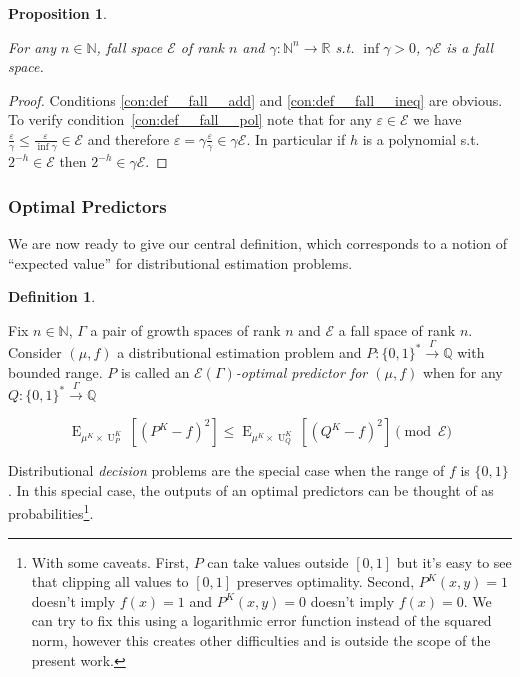 \documentclass{article}
\numberwithin{equation}{section}
\theoremstyle{definition}
\newtheorem{definition}{Definition}[section]
\theoremstyle{plain}
\newtheorem{proposition}{Proposition}[section]
\newcommand{\Bool}{\{0,1\}}
\newcommand{\Words}{{\Bool^*}}
\DeclareMathOperator{\E}{E}
\DeclareMathOperator{\Un}{U}
\newcommand{\Nats}{\mathbb{N}}
\newcommand{\Rats}{\mathbb{Q}}
\newcommand{\Reals}{\mathbb{R}}
\newcommand{\Fall}{\mathcal{E}}
\newcommand{\EG}{\Fall(\Gamma)}
\newcommand{\Scheme}{\xrightarrow{\Gamma}}
\begin{document}
\begin{samepage}
\begin{proposition}
\label{prp:tbd}

For any $n \in \Nats$, fall space $\Fall$ of rank $n$ and $\gamma: \Nats^n \rightarrow \Reals$ s.t. $\inf \gamma > 0$, $\gamma \Fall$ is a fall space.

\end{proposition}
\end{samepage}

\begin{proof}

Conditions \ref{con:def__fall__add} and \ref{con:def__fall__ineq} are obvious. To verify condition~\ref{con:def__fall__pol} note that for any $\varepsilon \in \Fall$ we have $\frac{\varepsilon}{\gamma} \leq \frac{\varepsilon}{\inf \gamma} \in \Fall$ and therefore $\varepsilon = \gamma \frac{\varepsilon}{\gamma} \in \gamma \Fall$. In particular if $h$ is a polynomial s.t. $2^{-h} \in \Fall$ then $2^{-h} \in \gamma \Fall$.
%
\end{proof}

\subsubsection{Optimal Predictors}

We are now ready to give our central definition, which corresponds to a notion of \enquote{expected value} for distributional estimation problems.

\begin{definition}
\label{def:op}

Fix $n \in \Nats$, $\Gamma$ a pair of growth spaces of rank $n$ and $\Fall$ a fall space of rank $n$. Consider $(\mu,f)$ a distributional estimation problem and $P: \Words \Scheme \Rats$ with bounded range. $P$ is called an \emph{$\EG$-optimal predictor for $(\mu,f)$} when for any $Q: \Words \Scheme \Rats$

\begin{equation}
\label{eqn:op}
\E_{\mu^{K} \times \Un_P^K}[(P^K - f)^2] \leq \E_{\mu^{K} \times \Un_Q^K}[(Q^K - f)^2] \pmod \Fall
\end{equation}

\end{definition}

Distributional \emph{decision} problems are the special case when the range of $f$ is $\Bool$. In this special case, the outputs of an optimal predictors can be thought of as probabilities\footnote{With some caveats. First, $P$ can take values outside $[0,1]$ but it's easy to see that clipping all values to $[0,1]$ preserves optimality. Second, $P^{K}(x,y)=1$ doesn't imply $f(x) = 1$ and $P^{K}(x,y)=0$ doesn't imply $f(x)=0$. We can try to fix this using a logarithmic error function instead of the squared norm, however this creates other difficulties and is outside the scope of the present work.}.
\end{document}
